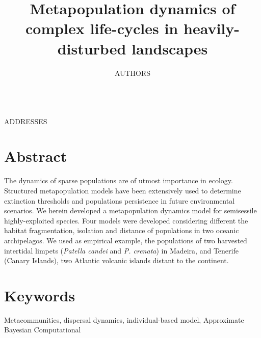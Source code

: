 \documentclass[12pt]{article}
\date{}
\begin{document}
\begin{flushleft}
\title{Metapopulation dynamics of complex life-cycles in heavily-disturbed landscapes}
\maketitle
\author{AUTHORS}
\\
\small{ADDRESSES}
\\
\doublespacing
\section{Abstract}
The dynamics of sparse populations are of utmost importance in ecology. Structured metapopulation models have been extensively used to determine extinction thresholds and populations persistence in future environmental scenarios. We herein developed a metapopulation dynamics model for semisessile highly-exploited species. Four models were developed considering different the habitat fragmentation, isolation and distance of populations in two oceanic archipelagos. We used as empirical example, the populations of two harvested intertidal limpets (\textit{Patella candei} and \textit{P. crenata}) in Madeira, and Tenerife (Canary Islands), two Atlantic volcanic islands distant to the continent.

\section{Keywords}
Metacommunities, dispersal dynamics, individual-based model, Approximate Bayesian Computational


\end{flushleft}
\end{document}
